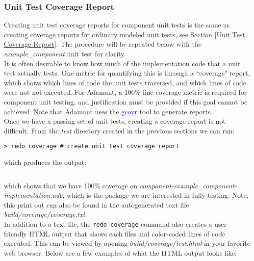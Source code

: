 \subsubsection{Unit Test Coverage Report}

Creating unit test coverage reports for component unit tests is the same as creating coverage reports for ordinary modeled unit tests, see Section \ref{Unit Test Coverage Report}. The procedure will be repeated below with the \textit{example\_component} unit test for clarity. \\

It is often desirable to know how much of the implementation code that a unit test actually tests. One metric for quantifying this is through a ``coverage" report, which shows which lines of code the unit tests traversed, and which lines of code were not not executed. For Adamant, a 100\% line coverage metric is required for component unit testing, and justification must be provided if this goal cannot be achieved. Note that Adamant uses the \href{https://gcovr.com/en/stable/}{\textcolor{blue}{gcovr}} tool to generate reports. \\

Once we have a passing set of unit tests, creating a coverage report is not difficult. From the \textit{test} directory created in the previous sections we can run:

\vspace{5mm} %
\begin{verbatim}
> redo coverage # create unit test coverage report
\end{verbatim}
\vspace{5mm} %

which produces the output:

\vspace{5mm} %
\inputminted{text}{../example_architecture/example_component/test3/build/coverage/coverage.txt}
\vspace{5mm} %

which shows that we have 100\% coverage on \textit{component-example\_component-implementation.adb}, which is the package we are interested in fully testing. Note, this print out can also be found in the autogenerated text file \textit{build/coverage/coverage.txt}. \\

In addition to a text file, the \texttt{redo coverage} command also creates a user friendly HTML output that shows each files and color-coded lines of code executed. This can be viewed by opening \textit{build/coverage/test.html} in your favorite web browser. Below are a few examples of what the HTML output looks like: \\

